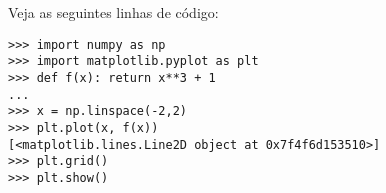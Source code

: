 \begin{ex}
  Veja as seguintes linhas de código:
\begin{verbatim}
>>> import numpy as np
>>> import matplotlib.pyplot as plt
>>> def f(x): return x**3 + 1
... 
>>> x = np.linspace(-2,2)
>>> plt.plot(x, f(x))
[<matplotlib.lines.Line2D object at 0x7f4f6d153510>]
>>> plt.grid()
>>> plt.show()
\end{verbatim}
\end{ex}